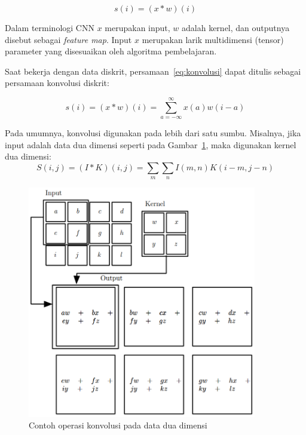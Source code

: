 \begin{equation}
    \label{eq:konvolusi}
    s(i) = (x * w)(i)
\end{equation}

Dalam terminologi CNN $x$ merupakan input, $w$ adalah kernel, dan outputnya disebut sebagai \textit{feature map}. Input $x$ merupakan larik multidimensi (tensor) parameter yang disesuaikan oleh algoritma pembelajaran.

Saat bekerja dengan data diskrit, persamaan~\ref{eq:konvolusi} dapat ditulis sebagai persamaan konvolusi diskrit:

\begin{equation}
    \label{eq:konvolusi-diskrit}
    s(i) = (x * w)(i) = \sum_{a=-\infty}^{\infty} x(a) w(i - a)
\end{equation}

Pada umumnya, konvolusi digunakan pada lebih dari satu sumbu. Misalnya, jika input adalah data dua dimensi seperti pada Gambar~\ref{gambar:konvolusi-2d}, maka digunakan kernel dua dimensi:
\begin{equation}
    \label{eq:konvolusi-2d}
    S(i,j) = (I * K)(i,j) = \sum_{m}\sum_{n}I(m,n)K(i-m, j-n)
\end{equation}

\begin{figure}[t!]
    \centering
    \includegraphics[width=10cm]{gambar/landasan-teori/konvolusi-2d.png}
    \caption{Contoh operasi konvolusi pada data dua dimensi \Parencite{Goodfellow-2016}}
    \label{gambar:konvolusi-2d}
\end{figure}


